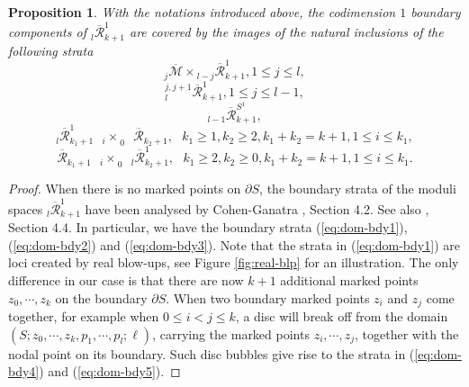 \documentclass[a4paper]{article}
\newtheorem{proposition}[theorem]{Proposition}
\numberwithin{equation}{section}
\begin{document}
\begin{proposition}\label{proposition:domain-bdy}
With the notations introduced above, the codimension $1$ boundary components of ${}_l\overline{\mathcal{R}}_{k+1}^1$ are covered by the images of the natural inclusions of the following strata
\begin{equation}\label{eq:dom-bdy1}
{}_j\overline{\mathcal{M}}\times{}_{l-j}\overline{\mathcal{R}}_{k+1}^1, 1\leq j\leq l,
\end{equation}
\begin{equation}\label{eq:dom-bdy2}
{}_l^{j,j+1}\overline{\mathcal{R}}_{k+1}^1, 1\leq j\leq l-1,
\end{equation}
\begin{equation}\label{eq:dom-bdy3}
{}_{l-1}\overline{\mathcal{R}}_{k+1}^{S^1},
\end{equation}
\begin{equation}\label{eq:dom-bdy4}
{}_l\overline{\mathcal{R}}_{k_1+1}^1\textrm{ }{{}_i\times}_0\textrm{ }\overline{\mathcal{R}}_{k_2+1},\textrm{ }k_1\geq1,k_2\geq2,k_1+k_2=k+1,1\leq i\leq k_1,
\end{equation}
\begin{equation}\label{eq:dom-bdy5}
\overline{\mathcal{R}}_{k_1+1}\textrm{ }{{}_i\times}_0\textrm{ }{}_l\overline{\mathcal{R}}_{k_2+1}^1,\textrm{ }k_1\geq2,k_2\geq0,k_1+k_2=k+1, 1\leq i\leq k_1.
\end{equation}
\end{proposition}
\begin{proof}
When there is no marked points on $\partial S$, the boundary strata of the moduli spaces ${}_l\overline{\mathcal{R}}^1_{k+1}$ have been analysed by Cohen-Ganatra \cite{cg}, Section 4.2. See also \cite{jz}, Section 4.4. In particular, we have the boundary strata (\ref{eq:dom-bdy1}), (\ref{eq:dom-bdy2}) and (\ref{eq:dom-bdy3}). Note that the strata in (\ref{eq:dom-bdy1}) are loci created by real blow-ups, see Figure \ref{fig:real-blp} for an illustration. The only difference in our case is that there are now $k+1$ additional marked points $z_0,\cdots,z_k$ on the boundary $\partial S$. When two boundary marked points $z_i$ and $z_j$ come together, for example when $0\leq i<j\leq k$, a disc will break off from the domain $(S;z_0,\cdots,z_k,p_1,\cdots,p_l;\ell)$, carrying the marked points $z_i,\cdots,z_j$, together with the nodal point on its boundary. Such disc bubbles give rise to the strata in (\ref{eq:dom-bdy4}) and (\ref{eq:dom-bdy5}).
\end{proof}
\end{document}
